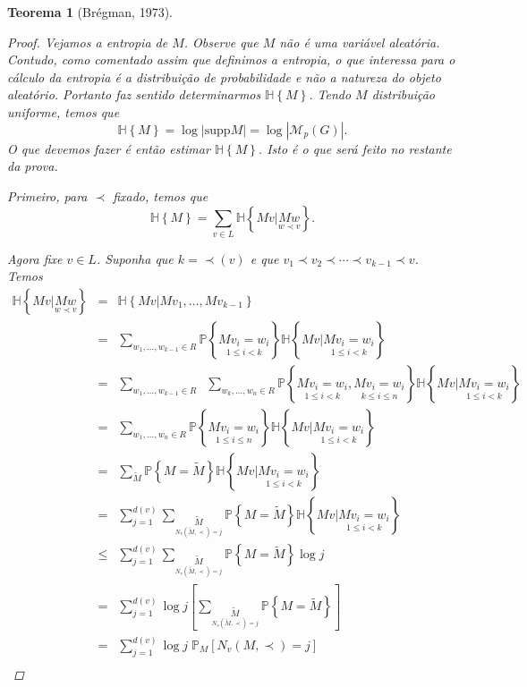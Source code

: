 \documentclass{amsart}
\theoremstyle{theorem}
\newtheorem{teorema}{Teorema}[section]
\theoremstyle{definition}
\theoremstyle{remark}
\numberwithin{equation}{section}
\newcommand{\PP}[1]{\mathbb{P}\left\{ #1 \right\}}
\newcommand{\HH}[1]{\mathbb{H}\left\{ #1 \right\}}
\newcommand{\supp}[1]{\mathrm{supp} #1}
\begin{document}
\begin{teorema}[Br\'{e}gman, 1973]
\begin{proof}
    Vejamos a entropia de $M$. Observe que $M$ n\~{a}o \'{e} uma vari\'{a}vel aleat\'{o}ria. Contudo, como comentado assim que definimos a entropia, o que interessa para o c\'{a}lculo da entropia \'{e} a distribui\c{c}\~{a}o de probabilidade e n\~{a}o a natureza do objeto aleat\'{o}rio. Portanto faz sentido determinarmos $\HH{M}$. Tendo $M$ distribui\c{c}\~{a}o uniforme, temos que
    \begin{equation}
      \HH{M} = \log|\supp{M}| = \log |\mathcal{M}_p(G)|.
    \end{equation}
    O que devemos fazer \'{e} ent\~{a}o estimar $\HH{M}$. Isto \'{e} o que ser\'{a} feito no restante da prova.

    Primeiro, para $\prec$ fixado, temos que
    \begin{equation}
      \HH{M} = \sum_{v\in L} \HH{Mv\Big|\underset{w \prec v}{Mw}}.
    \end{equation}

    Agora fixe $v\in L$. Suponha que $k = \prec(v)$ e que $v_1 \prec v_2 \prec \cdots \prec v_{k-1} \prec v$. Temos
    \begin{equation}
    \begin{array}{rcl}
      \HH{Mv\Big|\underset{w \prec v}{Mw}} &=&  \HH{Mv|Mv_1,\ldots,Mv_{k-1}} \\
      &=& \displaystyle \sum_{w_1,\ldots,w_{k-1}\in R} \PP{\underset{1 \leq i<k}{Mv_i=w_i}} \HH{Mv \Big|{\underset{1 \leq i<k}{Mv_i=w_i}}}\\
      &=& \displaystyle \sum_{w_1,\ldots,w_{k-1}\in R} \;\;\sum_{w_k,\ldots,w_n\in R} \PP{\underset{1 \leq i<k}{Mv_i=w_i},{\underset{k\leq i\leq n}{Mv_i=w_i}}} \HH{Mv \Big|{\underset{1 \leq i<k}{Mv_i=w_i}}}\\
      &=& \displaystyle \sum_{w_1,\ldots,w_n\in R} \PP{{\underset{1\leq i\leq n}{Mv_i=w_i}}} \HH{Mv \Big|{\underset{1 \leq i<k}{Mv_i=w_i}}}\\
      &=& \displaystyle \sum_{\widetilde{M}} \PP{M = \tilde{M}} \HH{Mv \Big|{\underset{1 \leq i<k}{Mv_i=w_i}}}\\
      &=& \displaystyle \sum_{j=1}^{d(v)} \sum_{\underset{N_v(\widetilde{M},\prec)=j}{\widetilde{M}}} \PP{M = \tilde{M}} \HH{Mv \Big|{\underset{1 \leq i<k}{Mv_i=w_i}}}\\
      &\leq& \displaystyle \sum_{j=1}^{d(v)} \sum_{\underset{N_v(\widetilde{M},\prec)=j}{\widetilde{M}}} \PP{M = \tilde{M}} \log{j}\\
      &=& \displaystyle \sum_{j=1}^{d(v)} \log{j} \left[\sum_{\underset{N_v(\widetilde{M},\prec)=j}{\widetilde{M}}} \PP{M = \tilde{M}}\right] \\
      &=& \displaystyle \sum_{j=1}^{d(v)} \log{j} \;\mathbb{P}_{M} \left[N_v(M,\prec) = j\right] \\
    \end{array}
    \end{equation}
    

\end{proof}
\end{teorema}
\end{document}
